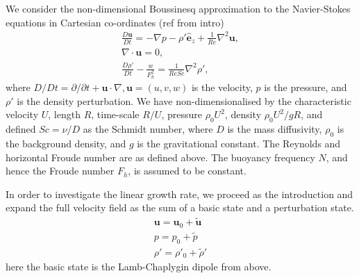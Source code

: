 We consider the non-dimensional Boussinesq approximation to the Navier-Stokes equations in Cartesian co-ordinates (ref from intro)
\begin{align}
\frac{D\bm{u}}{Dt} = -\nabla p - \rho'\hat{\bm{e}}_{z} + \frac{1}{Re}\nabla^{2} \bm{u},\\
\nabla \cdot \bm{u}=0,\\
\frac{D\rho'}{Dt} -\frac{w}{F_{h}^{2}} = \frac{1}{ReSc}\nabla^{2} \rho',
\end{align}
where $D/Dt=\partial/\partial t + \bm{u}\cdot \nabla, \bm{u}=(u,v,w)$ is the velocity, $p$ is the pressure, and $\rho'$ is the density perturbation. We have non-dimensionalised by the characteristic velocity $U$, length $R$, time-scale $R/U$, pressure $\rho_{0}U^{2}$, density $\rho_{0}U^{2}/gR$, and defined $Sc=\nu /D$ as the Schmidt number, where $D$ is the mass diffusivity, $\rho_{0}$ is the background density, and $g$ is the gravitational constant. The Reynolds and horizontal Froude number are as defined above. The buoyancy frequency $N$, and hence the Froude number $F_{h}$, is assumed to be constant. 

In order to investigate the linear growth rate, we proceed as the introduction and expand the full velocity field as the sum of a basic state and a perturbation state. 
\begin{align}
\bm{u} = \bm{u}_{0} + \tilde{\bm{u}}\\
p = p_{0} + \tilde{p}\\
\rho' = \rho'_{0} + \tilde{\rho}' 
\end{align}
here the basic state is the Lamb-Chaplygin dipole from above. 


